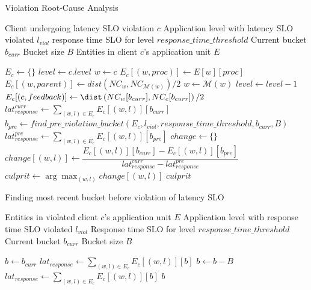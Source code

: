 \begin{algorithm}
\caption{Violation Root-Cause Analysis}
\label{algo:violation_root_cause}
\begin{algorithmic}[1]
\Require Client undergoing latency SLO violation $c$
\Require Application level with latency SLO violated $l_{viol}$
\Require response time SLO for level $response\_time\_threshold$
\Require Current bucket $b_{curr}$
\Require Bucket size $B$
\Require Entities in client $c$'s application unit $E$

\State $E_c \gets \{\}$ 
\State $level \gets c.level$
\State $w \gets c$
 
    \State $E_c [\left( w, proc \right)] \gets E[w][proc]$
        \State $E_c [\left( w, parent \right)] \gets dist \left( NC_w, NC_{\mathcal{M} \left(w \right)}\right)/2$
        \State $w \gets \mathcal{M} \left(w \right)$
    \EndIf
    \State $level \gets level - 1$
\EndWhile
\State $E_c  [\left( c, feedback \right) ]\gets \dist \left( NC_w[b_{curr}], NC_{c}[b_{curr}]\right)/2$ 
\State $lat_{response}^{curr} \gets \sum_{\left( w, l\right) \in E_c}{E_c[\left( w, l\right)][b_{curr}]}$   
\State $b_{pre} \gets find\_pre\_violation\_bucket \left( E_c, l_{viol}, response\_time\_threshold, b_{curr}, B \right)$
\State $lat_{response}^{pre} \gets \sum_{\left( w, l\right) \in E_c}{E_c[\left( w, l\right)][b_{pre}]}$    
\State $change \gets \{\}$  
    \State $change [\left(w, l\right)] \gets \dfrac{E_c[\left( w, l \right)][b_{curr}] - E_c[\left( w, l \right)][b_{pre}]}{lat_{response}^{curr} - lat_{response}^{pre}}$
\EndFor
\State $culprit \gets \arg\max_{\left(w, l\right)} change[\left( w, l\right)]$
\State \Return $culprit$
\end{algorithmic}
\end{algorithm}

\begin{algorithm}
\caption{Finding most recent bucket before violation of latency SLO}
\begin{algorithmic}[1]
\Require Entities in violated client $c$'s application unit $E$
\Require Application level with response time SLO violated $l_{viol}$
\Require Response time SLO for level $response\_time\_threshold$
\Require Current bucket $b_{curr}$
\Require Bucket size $B$

\State $b \gets b_{curr}$
\State $lat_{response} \gets \sum_{\left( w, l\right) \in E_c}{E_c[\left( w, l\right)][b]}$
    \State $b \gets b - B$ 
    \State $lat_{response} \gets \sum_{\left( w, l\right) \in E_c}{E_c[\left( w, l\right)][b]}$
\EndWhile
\State \Return $b$
\end{algorithmic}
\end{algorithm}

